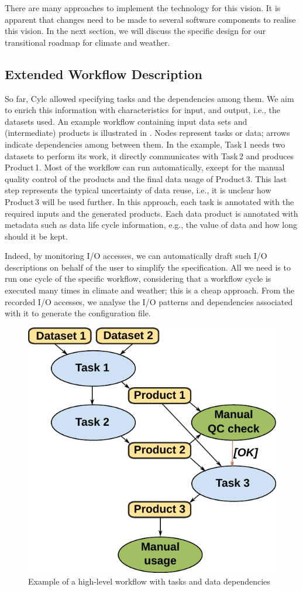 \documentclass[a4paper]{article}
\begin{document}
There are many approaches to implement the technology for this vision. It is apparent that changes need to be made to several software components to realise this vision.
In the next section, we will discuss the specific design for our transitional roadmap for climate and weather.


\subsection{Extended Workflow Description}

So far, Cylc allowed specifying tasks and the dependencies among them.
We aim to enrich this information with characteristics for input, and output, i.e., the datasets used.
An example workflow containing input data sets and (intermediate) products is illustrated in .
Nodes represent tasks or data; arrows indicate dependencies among between them.
In the example, Task\,1 needs two datasets to perform its work, it directly communicates with Task\,2 and produces Product\,1.
Most of the workflow can run automatically, except for the manual quality control of the products and the final data usage of Product\,3.
This last step represents the typical uncertainty of data reuse, i.e., it is unclear how Product\,3 will be used further.
In this approach, each task is annotated with the required inputs and the generated products.
Each data product is annotated with metadata such as data life cycle information, e.g., the value of data and how long should it be kept.

Indeed, by monitoring I/O accesses, we can automatically draft such I/O descriptions on behalf of the user to simplify the specification.
All we need is to run one cycle of the specific workflow, considering that a workflow cycle is executed many times in climate and weather; this is a cheap approach.
From the recorded I/O accesses, we analyse the I/O patterns and dependencies associated with it to generate the configuration file.

\begin{figure}[H]
  \centering
  \includegraphics[width=0.4\columnwidth]{workflow}
  \caption{Example of a high-level workflow with tasks and data dependencies}
  \label{fig:workflow}
\end{figure}
\end{document}
